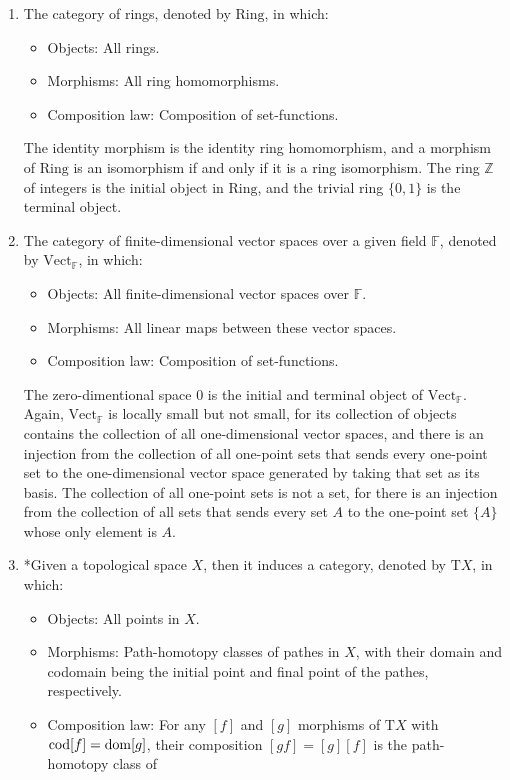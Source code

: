 \begin{example}
\begin{enumerate}[label=(\roman*)]
	\item The category of rings, denoted by $\mathrm{Ring}$, in which:
		\begin{itemize}
			\item Objects: All rings.
			\item Morphisms: All ring homomorphisms.
			\item Composition law: Composition of set-functions.
		\end{itemize}
	The identity morphism is the identity ring homomorphism, and a morphism of $\mathrm{Ring}$ is an isomorphism if and only if it is a ring isomorphism. The ring $\mathbb{Z}$ of integers is the initial object in $\mathrm{Ring}$, and the trivial ring $\{0,1\}$ is the terminal object.
	\item The category of finite-dimensional vector spaces over a given field $\mathbb{F}$, denoted by $\mathrm{Vect}_\mathbb{F}$, in which:
		\begin{itemize}
			\item Objects: All finite-dimensional vector spaces over $\mathbb{F}$.
			\item Morphisms: All linear maps between these vector spaces.
			\item Composition law: Composition of set-functions.
		\end{itemize}
	The zero-dimentional space $0$ is the initial and terminal object of $\mathrm{Vect}_\mathbb{F}$. Again, $\mathrm{Vect}_\mathbb{F}$ is locally small but not small, for its collection of objects contains the collection of all one-dimensional vector spaces, and there is an injection from the collection of all one-point sets that sends every one-point set to the one-dimensional vector space generated by taking that set as its basis. The collection of all one-point sets is not a set, for there is an injection from the collection of all sets that sends every set $A$ to the one-point set $\{A\}$ whose only element is $A$.
	\item *Given a topological space $X$, then it induces a category, denoted by $\mathrm{T}X$, in which:
		\begin{itemize}
			\item Objects: All points in $X$.
			\item Morphisms: Path-homotopy classes of pathes in $X$, with their domain and codomain being the initial point and final point of the pathes, respectively.
			\item Composition law: For any $[f]$ and $[g]$ morphisms of $\mathrm{T}X$ with $\operatorname{cod}[f]=\operatorname{dom} [g]$, their composition $[gf]=[g][f]$ is the path-homotopy class of

\end{itemize}
\end{enumerate}
\end{example}
